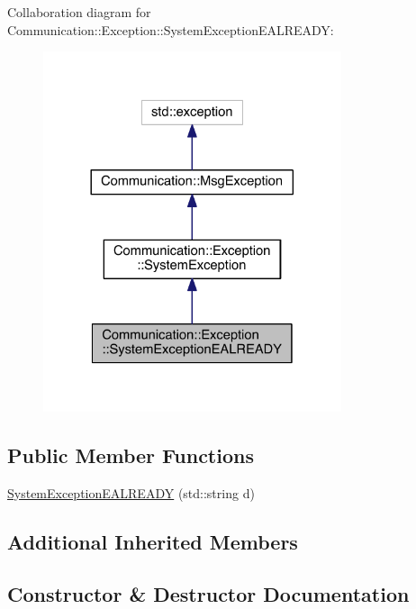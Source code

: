 Collaboration diagram for Communication\+:\+:Exception\+:\+:System\+Exception\+E\+A\+L\+R\+E\+A\+D\+Y\+:\nopagebreak
\begin{figure}[H]
\begin{center}
\leavevmode
\includegraphics[width=248pt]{class_communication_1_1_exception_1_1_system_exception_e_a_l_r_e_a_d_y__coll__graph}
\end{center}
\end{figure}
\subsection*{Public Member Functions}
\begin{DoxyCompactItemize}
\item 
\hyperlink{class_communication_1_1_exception_1_1_system_exception_e_a_l_r_e_a_d_y_a284ab28ac9a8c101ccfc9f26984d9a7c}{System\+Exception\+E\+A\+L\+R\+E\+A\+D\+Y} (std\+::string d)
\end{DoxyCompactItemize}
\subsection*{Additional Inherited Members}


\subsection{Constructor \& Destructor Documentation}
\hypertarget{class_communication_1_1_exception_1_1_system_exception_e_a_l_r_e_a_d_y_a284ab28ac9a8c101ccfc9f26984d9a7c}{}
